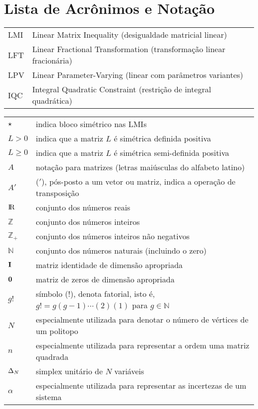 
\chapter*{Lista de Acrônimos e Notação}

\begin{tabular}{ll}
LMI  & Linear Matrix Inequality (desigualdade matricial linear)\\
LFT  & Linear Fractional Transformation (transformação linear fracionária)\\
LPV  & Linear Parameter-Varying (linear com parâmetros variantes)\\
IQC  & Integral Quadratic Constraint (restrição de integral quadrática)\\
\end{tabular}

\vspace*{1cm}

\begin{tabular}{ll}
$\star$ & indica bloco simétrico nas LMIs\\
$L > 0$ & indica que a matriz $L$ é simétrica definida positiva\\
$L \geq 0$ & indica que a matriz $L$ é simétrica semi-definida positiva\\
$A$ & notação para matrizes (letras maiúsculas do alfabeto latino)\\
$A'$ & ($'$), pós-posto a um vetor ou matriz, indica a operação de transposição\\
${\rm I\kern-.17em R}$ & conjunto dos números reais\\
$\mathbb{Z}$ & conjunto dos números inteiros\\
$\mathbb{Z}_+$ & conjunto dos números inteiros não negativos\\
$\mathbb{N}$ & conjunto dos números naturais (incluindo o zero)\\
${\bf I}$ & matriz identidade de dimensão apropriada\\
${\bf 0}$ & matriz de zeros de dimensão apropriada\\
$g!$ & símbolo (!), denota fatorial, isto é, $g!=g (g-1) \cdots (2) (1)$ para $g \in \mathbb{N}$\\
$N$ & especialmente utilizada para denotar o número de vértices de um politopo\\
$n$ & especialmente utilizada para representar a ordem uma matriz quadrada\\
$\Delta_N$ & simplex unitário de $N$ variáveis\\
$\alpha$ & especialmente utilizada para representar as incertezas de um sistema
\end{tabular}


